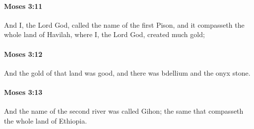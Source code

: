 		\paragraph{Moses 3:11} %
			\label{MOSES-3-11}

			And I, the Lord God, called the name of the first Pison, and it compasseth the whole land of Havilah, where I, the Lord God, created much gold;


		\paragraph{Moses 3:12} %
			\label{MOSES-3-12}

			And the gold of that land was good, and there was bdellium and the onyx stone.


		\paragraph{Moses 3:13} %
			\label{MOSES-3-13}

			And the name of the second river was called Gihon; the same that compasseth the whole land of Ethiopia.


